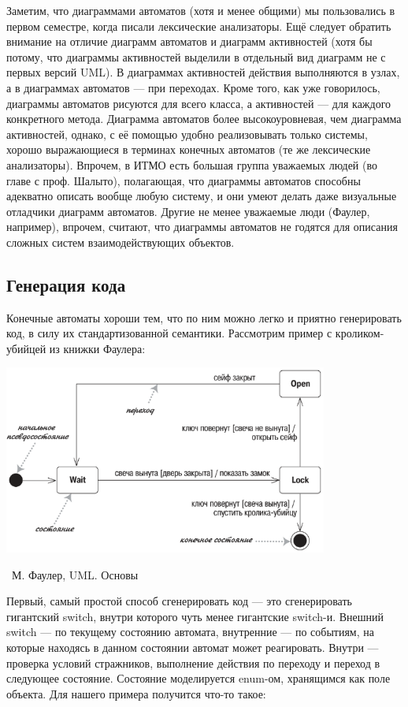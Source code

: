 \documentclass[a5paper]{article}
\newcommand{\attribution}[1] {
    \vspace{-5mm}\begin{flushright}\begin{scriptsize}%
    {\textcopyright\, #1}\end{scriptsize}\end{flushright}
}
\begin{document}
Заметим, что диаграммами автоматов (хотя и менее общими) мы пользовались в первом семестре, когда писали лексические анализаторы. Ещё следует обратить внимание на отличие диаграмм автоматов и диаграмм активностей (хотя бы потому, что диаграммы активностей выделили в отдельный вид диаграмм не с первых версий UML). В диаграммах активностей действия выполняются в узлах, а в диаграммах автоматов --- при переходах. Кроме того, как уже говорилось, диаграммы автоматов рисуются для всего класса, а активностей --- для каждого конкретного метода. Диаграмма автоматов более высокоуровневая, чем диаграмма активностей, однако, с её помощью удобно реализовывать только системы, хорошо выражающиеся в терминах конечных автоматов (те же лексические анализаторы). Впрочем, в ИТМО есть большая группа уважаемых людей (во главе с проф. Шалыто), полагающая, что диаграммы автоматов способны адекватно описать вообще любую систему, и они умеют делать даже визуальные отладчики диаграмм автоматов. Другие не менее уважаемые люди (Фаулер, например), впрочем, считают, что диаграммы автоматов не годятся для описания сложных систем взаимодействующих объектов.

\subsection{Генерация кода}

Конечные автоматы хороши тем, что по ним можно легко и приятно генерировать код, в силу их стандартизованной семантики. Рассмотрим пример с кроликом-убийцей из книжки Фаулера:

\begin{center}
    \includegraphics[width=0.8\textwidth]{stateTransitionSyntax.png}
    \attribution{М. Фаулер, UML. Основы}
\end{center}

Первый, самый простой способ сгенерировать код --- это сгенерировать гигантский switch, внутри которого чуть менее гигантские switch-и. Внешний switch --- по текущему состоянию автомата, внутренние --- по событиям, на которые находясь в данном состоянии автомат может реагировать. Внутри --- проверка условий стражников, выполнение действия по переходу и переход в следующее состояние. Состояние моделируется enum-ом, хранящимся как поле объекта. Для нашего примера получится что-то такое:
\end{document}

